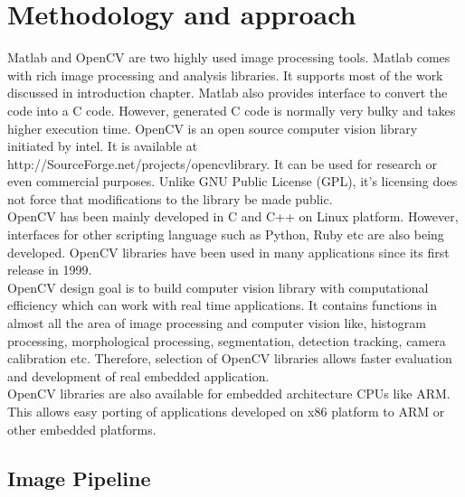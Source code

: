 
\chapter{Methodology and approach} %
\label{Chapter2}

\indent Matlab and OpenCV are two highly used image processing tools.
Matlab comes with rich image processing and analysis libraries. It
supports most of the work discussed in introduction chapter. Matlab also
provides interface to convert the code into a C code. However, generated
C code is normally very bulky and takes higher execution time. OpenCV is
an open source computer vision library initiated by intel. It is
available at http://SourceForge.net/projects/opencvlibrary. It can be
used for research or even commercial purposes. Unlike GNU Public License
(GPL), it's licensing does not force that modifications to the library
be made public. \\

\indent OpenCV has been mainly developed in C and C++ on Linux platform.
However, interfaces for other scripting language such as Python, Ruby
etc are also being developed. OpenCV libraries have been used in many
applications since its first release in 1999.\\

\indent OpenCV design goal is to build computer vision library with
computational efficiency which can work with real time applications. It
contains functions in almost all the area of image processing  and
computer vision like, histogram processing, morphological processing,
segmentation, detection tracking, camera calibration etc. Therefore,
selection of OpenCV libraries allows faster evaluation and development
of real embedded application.\\

\indent OpenCV libraries are also available for embedded architecture
CPUs like ARM. This allows easy porting of applications developed on x86
platform to ARM or other embedded platforms.\\

\pagebreak

\section{Image Pipeline}

